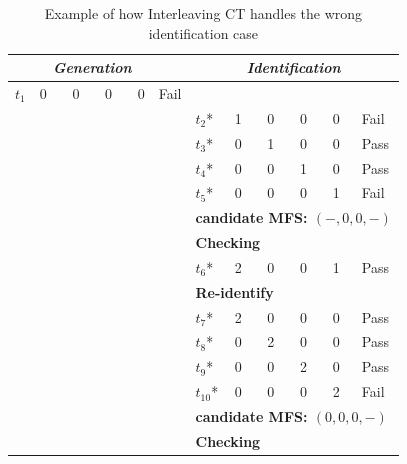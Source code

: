 \documentclass[journal,12pt,onecolumn,draftclsnofoot,]{IEEEtran}
\begin{document}
\begin{table}[ht]
\caption{Example of how Interleaving CT handles the wrong identification case}
\label{new-gi-returns-wrong}
\centering
\begin{tabular}{llllll|llllll}
\hline
 & \multicolumn{4}{c}{\bfseries \emph{Generation}}& & \multicolumn{6}{c}{\bfseries \emph{Identification}} \\
 \hline
$t_{1}$ & \multicolumn{4}{l}{0 \ \ \ 0 \ \ \ 0  \ \ \  0 } & Fail & \multicolumn{6}{l}{}\\
\multicolumn{5}{l}{}& & $t_{2}$* &\multicolumn{4}{l}{1  \ \ \  0 \ \ \  0 \ \ \  0 }& Fail \\
\multicolumn{5}{l}{}& &$t_{3}$* &\multicolumn{4}{l}{0  \ \ \   1 \ \ \  0 \ \ \  0} & Pass \\
\multicolumn{5}{l}{}& &$t_{4}$* &\multicolumn{4}{l}{0  \ \ \   0 \ \ \   1 \ \ \  0} & Pass \\
\multicolumn{5}{l}{}& &$t_{5}$* &\multicolumn{4}{l}{0  \ \ \   0 \ \ \   0 \ \ \   1} & Fail \\
\multicolumn{5}{l}{}& &\multicolumn{6}{l}{ \bfseries{candidate MFS}: $(-, 0, 0 , -)$ }  \\
\multicolumn{5}{l}{}& &\multicolumn{6}{l}{ \bfseries{\textbf{Checking}} }  \\
\multicolumn{5}{l}{}                                                                                                                                                           &      & $t_{6}$*     & \multicolumn{4}{l}{2  \ \ \   0 \ \ \   0 \ \ \  1}  & Pass   \\
\multicolumn{5}{l}{}& &\multicolumn{6}{l}{ \bfseries{\textbf{Re-identify}} }  \\
\multicolumn{5}{l}{}& & $t_{7}$* &\multicolumn{4}{l}{2  \ \ \  0 \ \ \  0 \ \ \  0 }& Pass \\
\multicolumn{5}{l}{}& &$t_{8}$* &\multicolumn{4}{l}{0  \ \ \   2 \ \ \  0 \ \ \  0} & Pass \\
\multicolumn{5}{l}{}& &$t_{9}$* &\multicolumn{4}{l}{0  \ \ \   0 \ \ \   2 \ \ \  0} & Pass \\
\multicolumn{5}{l}{}& &$t_{10}$* &\multicolumn{4}{l}{0  \ \ \   0 \ \ \   0 \ \ \   2} & Fail \\
\multicolumn{5}{l}{}& &\multicolumn{6}{l}{ \bfseries{candidate MFS}: $(0, 0, 0 , -)$ }  \\
\multicolumn{5}{l}{}& &\multicolumn{6}{l}{ \bfseries{\textbf{Checking}} }  \\

\end{tabular}
\end{table}
\end{document}
